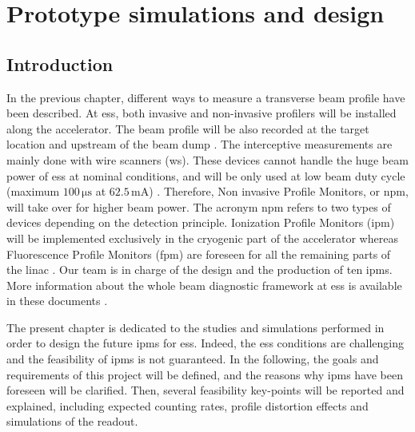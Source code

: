 \chapter{Prototype simulations and design}
\cleardoublepage
\minitoc
\section{Introduction}
\begin{refsection}
  \label{ch3:Introduction}
  In the previous chapter, different ways to measure a transverse beam profile have been described. At \acrshort{ess}, both invasive and non-invasive profilers will be installed along the accelerator. The beam profile will be also recorded at the target location and upstream of the beam dump \cite{shea2013}. The interceptive measurements are mainly done with wire scanners (\acrshort{ws}). These devices cannot handle the huge beam power of \acrshort{ess} at nominal conditions, and will be only used at low beam duty cycle (maximum $100\,\mathrm{\mu s}$ at $62.5\,\mathrm{mA}$) \cite{Cheymol2013}. Therefore, Non invasive Profile Monitors, or \acrshort{npm}, will take over for higher beam power. The acronym \acrshort{npm} refers to two types of devices depending on the detection principle. Ionization Profile Monitors (\acrshort{ipm}) will be implemented exclusively in the cryogenic part of the accelerator whereas Fluorescence Profile Monitors (\acrshort{fpm}) are foreseen for all the remaining parts of the linac \cite{Thomas2016}. Our team is in charge of the design and the production of ten \acrshort{ipm}s. More information about the whole beam diagnostic framework at \acrshort{ess} is available in these documents \cite{Peggs2013,Shea:IBIC2017-MO2AB2}.

  The present chapter is dedicated to the studies and simulations performed in order to design the future \acrshort{ipm}s for \acrshort{ess}. Indeed, the \acrshort{ess} conditions are challenging and the feasibility of \acrshort{ipm}s is not guaranteed. In the following, the goals and requirements of this project will be defined, and the reasons why \acrshort{ipm}s have been foreseen will be clarified. Then, several feasibility key-points will be reported and explained, including expected counting rates, profile distortion effects and simulations of the readout.


\end{refsection}
